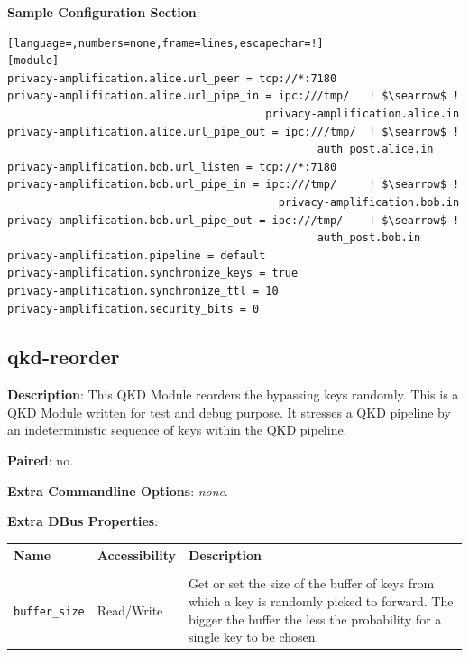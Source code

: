 \bigskip

\noindent \textbf{Sample Configuration Section}: 

\medskip

\begin{lstlisting}[language=,numbers=none,frame=lines,escapechar=!]
[module]
privacy-amplification.alice.url_peer = tcp://*:7180
privacy-amplification.alice.url_pipe_in = ipc:///tmp/   ! $\searrow$ !
                                        privacy-amplification.alice.in
privacy-amplification.alice.url_pipe_out = ipc:///tmp/  ! $\searrow$ !
                                                auth_post.alice.in
privacy-amplification.bob.url_listen = tcp://*:7180
privacy-amplification.bob.url_pipe_in = ipc:///tmp/     ! $\searrow$ !
                                          privacy-amplification.bob.in
privacy-amplification.bob.url_pipe_out = ipc:///tmp/    ! $\searrow$ !
                                                auth_post.bob.in
privacy-amplification.pipeline = default
privacy-amplification.synchronize_keys = true
privacy-amplification.synchronize_ttl = 10
privacy-amplification.security_bits = 0
\end{lstlisting}

\clearpage


\subsection{qkd-reorder}
\label{subsec:qkd-reorder}

\textbf{Description}: This QKD Module reorders the bypassing keys randomly. This is a QKD Module written for test and debug purpose. It stresses a QKD pipeline by an indeterministic sequence of keys within the QKD pipeline.

\bigskip

\noindent \textbf{Paired}: no.

\bigskip

\noindent \textbf{Extra Commandline Options}: \emph{none}.

\bigskip

\noindent \textbf{Extra DBus Properties}:

\medskip

\begin{tabular}{llp{7cm}}

Name                    & Accessibility &   Description \\
\hline
\\
\texttt{buffer\_size}   & Read/Write    &   Get or set the size of the buffer of keys from which a key is randomly picked to forward. The bigger the buffer the less the probability for a single key to be chosen. \\ [0.5em]

\end{tabular}

